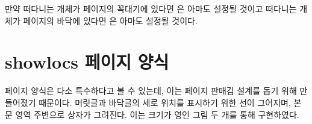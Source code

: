 \begin{lcode}
\newif\iffloatattop
  \floatattopfalse
\newif\iffloatatbot
  \floatatbotfalse

\renewcommand*{\@addtotoporbot}{%
  \@getfpsbit \tw@
  \ifodd \@tempcnta
    \@flsetnum \@topnum
    \ifnum \@topnum>\z@
      \@tempswafalse
      \@flcheckspace \@toproom \@toplist
      \if@tempswa
        \@bitor\@currtype{\@midlist\@botlist}%
        \if@test
        \else
          \@flupdates \@topnum \@toproom \@toplist
          \@inserttrue
  \global\floatattoptrue
        \fi
      \fi
    \fi
  \fi
  \if@insert
  \else
    \@addtobot
  \fi}

\renewcommand*{\@addtobot}{%
  \@getfpsbit 4\relax
  \ifodd \@tempcnta
    \@flsetnum \@botnum
    \ifnum \@botnum>\z@
      \@tempswafalse
      \@flcheckspace \@botroom \@botlist
      \if@tempswa
        \global \maxdepth \z@
        \@flupdates \@botnum \@botroom \@botlist
        \@inserttrue
  \global\floatatbottrue
      \fi
    \fi
  \fi}

\let\p@wold@output\@outputpage
\renewcommand*{\@outputpage}{%
  \p@wold@output
  \global\floatattopfalse
  \global\floatatbotfalse}

\endinput
\end{lcode}
만약 떠다니는 개체가 페이지의 꼭대기에 있다면 은 아마도 
설정될 것이고 떠다니는 개체가 페이지의 바닥에 있다면 은 아마도
 설정될 것이다.



\section{showlocs 페이지 양식}

 페이지 양식은 다소 특수하다고 볼 수 있는데, 이는 페이지 판매김
설계를 돕기 위해 만들어졌기 때문이다.
머릿글과 바닥글의 세로 위치를 표시하기 위한 선이 그어지며, 본문 영역 주변으로
상자가 그려진다.
이는 크기가 영인 그림 두 개를 통해
구현하였다.

